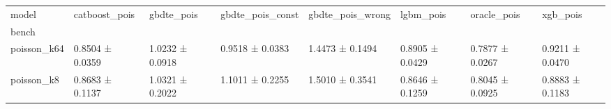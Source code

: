 \begin{tabular}{llllllll}
\toprule
model & catboost_pois & gbdte_pois & gbdte_pois_const & gbdte_pois_wrong & lgbm_pois & oracle_pois & xgb_pois \\
bench &  &  &  &  &  &  &  \\
\midrule
poisson_k64 & 0.8504 ± 0.0359 & 1.0232 ± 0.0918 & 0.9518 ± 0.0383 & 1.4473 ± 0.1494 & 0.8905 ± 0.0429 & 0.7877 ± 0.0267 & 0.9211 ± 0.0470 \\
poisson_k8 & 0.8683 ± 0.1137 & 1.0321 ± 0.2022 & 1.1011 ± 0.2255 & 1.5010 ± 0.3541 & 0.8646 ± 0.1259 & 0.8045 ± 0.0925 & 0.8883 ± 0.1183 \\
\bottomrule
\end{tabular}
